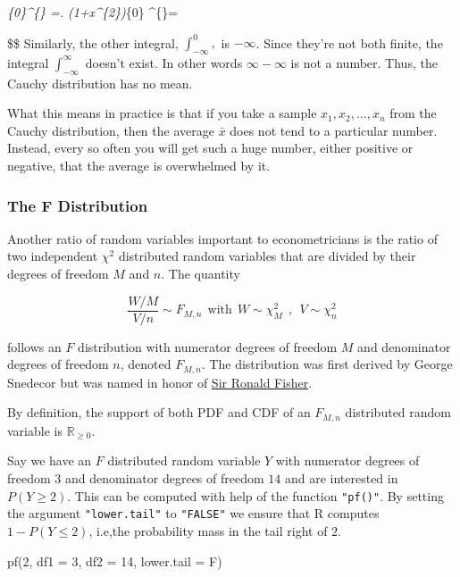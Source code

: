 \documentclass[
  letterpaper,
  DIV=11,
  numbers=noendperiod]{scrreprt}
\newenvironment{Shaded}{\begin{snugshade}}{\end{snugshade}}
\newcommand{\AttributeTok}[1]{\textcolor[rgb]{0.40,0.45,0.13}{#1}}
\newcommand{\DecValTok}[1]{\textcolor[rgb]{0.68,0.00,0.00}{#1}}
\newcommand{\FunctionTok}[1]{\textcolor[rgb]{0.28,0.35,0.67}{#1}}
\newcommand{\NormalTok}[1]{\textcolor[rgb]{0.00,0.23,0.31}{#1}}
\theoremstyle{definition}
\theoremstyle{plain}
\theoremstyle{plain}
\theoremstyle{remark}
\begin{document}
\int\emph{\{0\}\^{}\{\infty\}
=\left.
\log \left(1+x\^{}\{2\}\right)\right\textbar{}}\{0\}
\^{}\{\infty\}=\infty

\$\$ Similarly, the other integral, \(\int_{-\infty}^{0},\) is
\(-\infty\). Since they're not both finite, the integral
\(\int_{-\infty}^{\infty}\) doesn't exist. In other words
\(\infty-\infty\) is not a number. Thus, the Cauchy distribution has no
mean.

What this means in practice is that if you take a sample
\(x_{1}, x_{2}, \ldots, x_{n}\) from the Cauchy distribution, then the
average \(\bar{x}\) does not tend to a particular number. Instead, every
so often you will get such a huge number, either positive or negative,
that the average is overwhelmed by it.

\hypertarget{sec-Fdist}{%
\subsubsection{The F Distribution}\label{sec-Fdist}}

Another ratio of random variables important to econometricians is the
ratio of two independent \(\chi^2\) distributed random variables that
are divided by their degrees of freedom \(M\) and \(n\). The quantity

\[ \frac{W/M}{V/n} \sim F_{M,n} \ \ \text{with} \ \ W \sim \chi^2_M \ \ , \ \ V \sim \chi^2_n \]

follows an \(F\) distribution with numerator degrees of freedom \(M\)
and denominator degrees of freedom \(n\), denoted \(F_{M,n}\). The
distribution was first derived by George Snedecor but was named in honor
of \href{https://en.wikipedia.org/wiki/Ronald_Fisher}{Sir Ronald
Fisher}.

By definition, the support of both PDF and CDF of an \(F_{M,n}\)
distributed random variable is \(\mathbb{R}_{\geq0}\).

Say we have an \(F\) distributed random variable \(Y\) with numerator
degrees of freedom \(3\) and denominator degrees of freedom \(14\) and
are interested in \(P(Y \geq 2)\). This can be computed with help of the
function \texttt{"pf()"}. By setting the argument \texttt{"lower.tail"}
to \texttt{"FALSE"} we ensure that \textsf{R} computes
\(1- P(Y \leq 2)\), i.e,the probability mass in the tail right of \(2\).

\begin{Shaded}
\begin{Highlighting}[]
\FunctionTok{pf}\NormalTok{(}\DecValTok{2}\NormalTok{, }\AttributeTok{df1 =} \DecValTok{3}\NormalTok{, }\AttributeTok{df2 =} \DecValTok{14}\NormalTok{, }\AttributeTok{lower.tail =}\NormalTok{ F)}
\end{Highlighting}
\end{Shaded}
\end{document}
